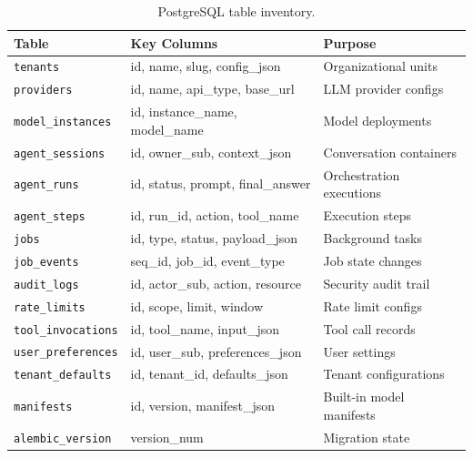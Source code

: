 \begin{table}[htbp]
    \centering
    \caption{PostgreSQL table inventory.}
    \label{tab:postgres-tables}
    \small
    \begin{tabularx}{\textwidth}{llX}
        \toprule
        \textbf{Table} & \textbf{Key Columns} & \textbf{Purpose} \\
        \midrule
        \texttt{tenants} & id, name, slug, config\_json & Organizational units \\
        \texttt{providers} & id, name, api\_type, base\_url & LLM provider configs \\
        \texttt{model\_instances} & id, instance\_name, model\_name & Model deployments \\
        \texttt{agent\_sessions} & id, owner\_sub, context\_json & Conversation containers \\
        \texttt{agent\_runs} & id, status, prompt, final\_answer & Orchestration executions \\
        \texttt{agent\_steps} & id, run\_id, action, tool\_name & Execution steps \\
        \texttt{jobs} & id, type, status, payload\_json & Background tasks \\
        \texttt{job\_events} & seq\_id, job\_id, event\_type & Job state changes \\
        \texttt{audit\_logs} & id, actor\_sub, action, resource & Security audit trail \\
        \texttt{rate\_limits} & id, scope, limit, window & Rate limit configs \\
        \texttt{tool\_invocations} & id, tool\_name, input\_json & Tool call records \\
        \texttt{user\_preferences} & id, user\_sub, preferences\_json & User settings \\
        \texttt{tenant\_defaults} & id, tenant\_id, defaults\_json & Tenant configurations \\
        \texttt{manifests} & id, version, manifest\_json & Built-in model manifests \\
        \texttt{alembic\_version} & version\_num & Migration state \\
        \bottomrule
    \end{tabularx}
\end{table}

